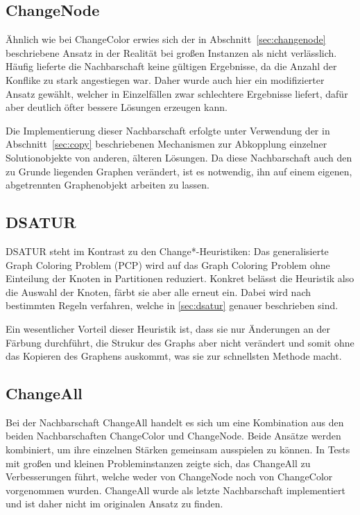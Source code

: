 \subsection{ChangeNode}
Ähnlich wie bei ChangeColor erwies sich der in Abschnitt~\ref{sec:changenode} beschriebene Ansatz in der Realität bei großen Instanzen als nicht verlässlich. Häufig lieferte die Nachbarschaft keine gültigen
Ergebnisse, da die Anzahl der Konflike zu stark angestiegen war. Daher wurde auch hier ein modifizierter Ansatz gewählt, welcher in Einzelfällen zwar schlechtere Ergebnisse liefert, dafür aber deutlich öfter
bessere Lösungen erzeugen kann.

Die Implementierung dieser Nachbarschaft erfolgte unter Verwendung der in Abschnitt~\ref{sec:copy} beschriebenen Mechanismen zur Abkopplung einzelner Solutionobjekte von anderen, älteren Lösungen. Da diese 
Nachbarschaft auch den zu Grunde liegenden Graphen verändert, ist es notwendig, ihn auf einem eigenen, abgetrennten Graphenobjekt arbeiten zu lassen. 

\subsection{DSATUR}
DSATUR steht im Kontrast zu den Change*-Heuristiken: Das generalisierte Graph Coloring Problem (PCP) wird auf das Graph Coloring Problem ohne Einteilung der Knoten in Partitionen reduziert. Konkret belässt die Heuristik also die Auswahl der Knoten, färbt sie aber alle erneut ein. Dabei wird nach be\-stim\-mt\-en Regeln verfahren, welche in \ref{sec:dsatur} genauer beschrieben sind.

Ein wesentlicher Vorteil dieser Heuristik ist, dass sie nur Änderungen an der Färbung durchführt, die Strukur des Graphs aber nicht verändert und somit ohne das Kopieren des Graphens auskommt, was sie zur schnellsten Methode macht.

\subsection{ChangeAll}
Bei der Nachbarschaft ChangeAll handelt es sich um eine Kombination aus den beiden Nachbarschaften ChangeColor und ChangeNode. Beide Ansätze werden kombiniert, um ihre einzelnen Stärken gemeinsam ausspielen
zu können. In Tests mit großen und kleinen Probleminstanzen zeigte sich, das ChangeAll zu Verbesserungen führt, welche weder von ChangeNode noch von ChangeColor vorgenommen wurden. ChangeAll wurde als letzte
Nachbarschaft implementiert und ist daher nicht im originalen Ansatz zu finden.

